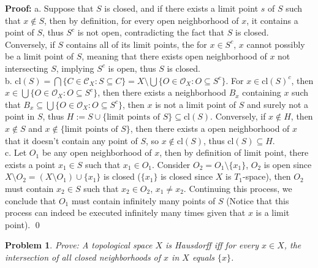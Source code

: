 \documentclass[12pt]{article}
\newtheorem{problem}{Problem}
\begin{document}
\textbf{Proof:} a. Suppose that $S$ is closed, and if there exists a limit point $s$ of $S$ such that $x\notin S$, then by definition, for every open neighborhood of $x$, it contains a point of $S$, thus $S^{c}$ is not open, contradicting the fact that $S$ is closed. Conversely, if $S$ contains all of its limit points, the for $x\in S^{c}$, $x$ cannot possibly be a limit point of $S$, meaning that there exists open neighborhood of $x$ not intersecting $S$, implying $S^{c}$ is open, thus $S$ is closed. \\
\indent b. $\text{cl}(S)=\bigcap\{C\in \mathcal{C}_{X}:S\subseteq C\}=X\setminus\bigcup\{O\in \mathcal{O}_{X}: O\subseteq S^{c}\}$. For $x\in \text{cl}(S)^{c}$, then $x\in \bigcup\{O\in\mathcal{O}_{X}: O\subseteq S^{c}\}$, then there exists a neighborhood $B_{x}$ containing $x$ such that $B_{x}\subseteq\bigcup\{O\in\mathcal{O}_{X}: O\subseteq S^{c}\}$, then $x$ is not a limit point of $S$ and surely not a point in $S$, thus $H:=S\cup\{\text{limit points of }S\}\subseteq\text{cl}(S)$. Conversely, if $x\notin H$, then $x\notin S$ and $x\notin \{\text{limit points of $S$}\}$, then there exists a open neighborhood of $x$ that it doesn't contain any point of $S$, so $x\notin \text{cl}(S)$, thus $\text{cl}(S)\subseteq H$.\\
\indent c. Let $O_{1}$ be any open neighborhood of $x$, then by definition of limit point, there exists a point $x_{1}\in S$ such that $x_{1}\in O_{1}$. Consider $O_{2}=O_{1}\setminus\{x_{1}\}$, $O_{2}$ is open since $X\setminus O_{2}=(X\setminus O_{1})\cup \{x_{1}\}$ is closed ($\{x_{1}\}$ is closed since $X$ is $T_{1}$-space), then $O_{2}$ must contain $x_{2}\in S$ such that $x_{2}\in O_{2}$, $x_{1}\neq x_{2}$. Continuing this process, we conclude that $O_{1}$ must contain infinitely many points of $S$ (Notice that this process can indeed be executed infinitely many times given that $x$ is a limit point). \qed
\\
\begin{problem}
Prove: A topological space $X$ is Hausdorff iff for every $x\in X$, the intersection of all closed neighborhoods of $x$ in $X$ equals $\{x\}$. 
\end{problem}
\end{document}
